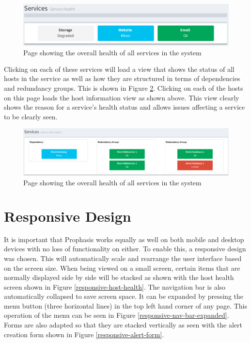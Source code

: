 \documentclass[bsc,deptreport,twoside,parskip,singlespacing,notimes]{infthesis}
\begin{document}
\begin{figure}[H]
	\centering
	\caption{Page showing the overall health of all services in the system}
	\label{service-health-index}
	\includegraphics[scale=0.6]{assets/screenshots/service-health-index.pdf}
\end{figure}


	Clicking on each of these services will load a view that shows the status of
	all hosts in the service as well as how they are structured in terms of
	dependencies and redundancy groups.  This is shown in Figure
	\ref{service-information}.  Clicking on each of the hosts on this page loads
	the host information view as shown above.  This view clearly shows the reason
	for a service's health status and allows issues affecting a service to be
	clearly seen.

\begin{figure}[H]
	\centering
	\caption{Page showing the overall health of all services in the system}
	\label{service-information}
	\includegraphics[scale=0.44]{assets/screenshots/service-information.pdf}
\end{figure}

\section{Responsive Design}
	It is important that Prophasis works equally as well on both mobile and desktop
	devices with no loss of functionality on either.  To enable this, a responsive design
	was chosen. This will automatically scale and rearrange the user interface
	based on the screen size.  When being viewed on a small screen, certain items
	that are normally displayed side by side will be stacked as shown with the
	host health screen shown in Figure \ref{responsive-host-health}. The navigation
	bar is also automatically collapsed to save screen space. It can be expanded
	by pressing the menu button (three horizontal lines) in the top left hand
	corner of any page.  This operation of the menu can be seen in Figure 
	\ref{responsive-nav-bar-expanded}.  Forms are also adapted so that they are
	stacked vertically as seen with the alert creation form shown in Figure
	\ref{responsive-alert-form}.
	
\end{document}
